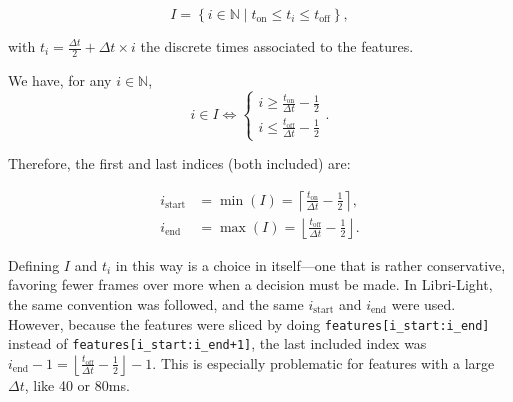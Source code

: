 \documentclass[11pt]{article}
\newcommand{\onset}{t_\text{on}}
\newcommand{\offset}{t_\text{off}}
\begin{document}
\begin{equation}
    I = \left\{ i \in \mathbb{N} \mid \onset \leq t_i \leq \offset \right\},
\end{equation}

with $t_i = \frac{\Delta t}{2} + \Delta t \times i$  the discrete times associated to the features.

We have, for any $i \in \mathbb{N}$,
\begin{equation}
    i \in I \Leftrightarrow \begin{cases}
        i \geq  \frac{\onset}{\Delta t} - \frac{1}{2} \\
        i \leq \frac{\offset}{\Delta t} - \frac{1}{2}
        \end{cases}.
\end{equation}

Therefore, the first and last indices (both included) are:

\begin{align}
    i_\text{start} & = \min(I) = \left\lceil \frac{\onset}{\Delta t} - \frac{1}{2} \right\rceil, \\
    i_\text{end} & = \max(I) = \left\lfloor \frac{\offset}{\Delta t} - \frac{1}{2} \right\rfloor.
\end{align}

Defining $I$ and $t_i$ in this way is a choice in itself---one that is rather conservative, favoring fewer frames over more when a decision must be made. In Libri-Light, the same convention was followed, and the same $i_\text{start}$ and $i_\text{end}$ were used. However, because the features were sliced by doing \verb|features[i_start:i_end]| instead of \verb|features[i_start:i_end+1]|, the last included index was $i_\text{end} - 1 = \left\lfloor \frac{\offset}{\Delta t} - \frac{1}{2} \right\rfloor - 1$. This is especially problematic for features with a large $\Delta t$, like 40 or 80ms.
\end{document}
